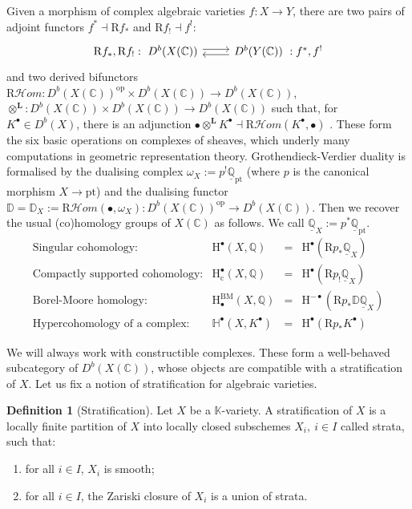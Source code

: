 \documentclass[11pt,english]{article}
\numberwithin{equation}{section}
\numberwithin{figure}{section}
\theoremstyle{definition}
\newtheorem{df}{Definition}[subsection]
\theoremstyle{plain}
\theoremstyle{remark}
\newcommand\HH{\mathrm{H}}
\newcommand\QQ{\mathbb{Q}}
\newcommand\KK{\mathbb{K}}
\newcommand\CC{\mathbb{C}}
\begin{document}
Given a morphism of complex algebraic varieties $f:X\rightarrow Y$,
there are two pairs of adjoint functors $f^{*}\dashv\mathrm{R}f_{*}$
and $\mathrm{R}f_{!}\dashv f^{!}$:\[
\begin{tikzcd}[ampersand replacement=\&]
\mathrm{R}f_{*},\mathrm{R}f_{!}: \ D^b(X(\CC)) \ar[r, shift left] \& D^b(Y(\CC))  \ :f^*,f^! \ar[l, shift left]
\end{tikzcd}
\]and two derived bifunctors $\mathrm{R}\mathcal{H}om:D^{b}(X(\CC))^{\mathrm{op}}\times D^{b}(X(\CC))\rightarrow D^{b}(X(\CC))$,
$\otimes^{\mathbf{L}}:D^{b}(X(\CC))\times D^{b}(X(\CC))\rightarrow D^{b}(X(\CC))$
such that, for $K^{\bullet}\in D^{b}(X)$, there is an adjunction
$\bullet\otimes^{\mathbf{L}}K^{\bullet}\dashv\mathrm{R}\mathcal{H}om(K^{\bullet},\bullet)$
\cite[Prop. 2.6.3.]{KS90}. These form the six basic operations on
complexes of sheaves, which underly many computations in geometric
representation theory. Grothendieck-Verdier duality is formalised
by the dualising complex $\omega_{X}:=p^{!}\underline{\QQ}_{\mathrm{pt}}$
(where $p$ is the canonical morphism $X\rightarrow\mathrm{pt}$)
and the dualising functor $\mathbb{D}=\mathbb{D}_{X}:=\mathrm{R}\mathcal{H}om(\bullet,\omega_{X}):D^{b}(X(\CC))^{\mathrm{op}}\rightarrow D^{b}(X(\CC))$.
Then we recover the usual (co)homology groups of $X(\CC)$ as follows.
We call $\underline{\QQ}_{X}:=p^{*}\underline{\QQ}_{\mathrm{pt}}$.\[
\begin{array}{llll}
\text{Singular cohomology:} & \HH^{\bullet}(X,\QQ) & = & \HH^{\bullet}(\mathrm{R}p_*\underline{\QQ}_{X}) \\
\text{Compactly supported cohomology:} & \HH_{\mathrm{c}}^{\bullet}(X,\QQ) & = & \HH^{\bullet}(\mathrm{R}p_!\underline{\QQ}_{X}) \\
\text{Borel-Moore homology:} & \HH_{\bullet}^{\mathrm{BM}}(X,\QQ) & = & \HH^{-\bullet}(\mathrm{R}p_*\mathbb{D}\underline{\QQ}_{X}) \\
\text{Hypercohomology of a complex:} & \mathbb{H}^{\bullet}(X,K^{\bullet}) & = & \HH^{\bullet}(\mathrm{R}p_*K^{\bullet})
\end{array}
\]

We will always work with constructible complexes. These form a well-behaved
subcategory of $D^{b}(X(\CC))$, whose objects are compatible with
a stratification of $X$. Let us fix a notion of stratification for
algebraic varieties.

\begin{df}[Stratification]

Let $X$ be a $\KK$-variety. A stratification of $X$ is a locally
finite partition of $X$ into locally closed subschemes $X_{i},\ i\in I$
called strata, such that:
\begin{enumerate}
\item for all $i\in I$, $X_{i}$ is smooth;
\item for all $i\in I$, the Zariski closure of $X_{i}$ is a union of strata.
\end{enumerate}
\end{df}
\end{document}
